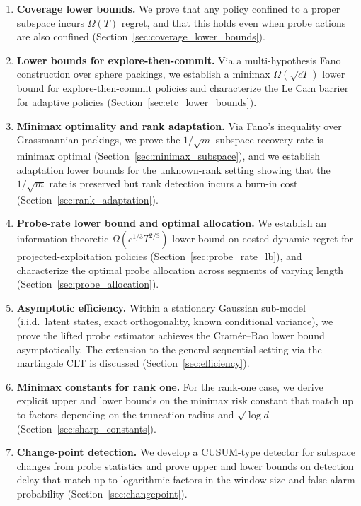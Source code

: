 \documentclass[12pt]{article}
\theoremstyle{plain}
\theoremstyle{definition}
\begin{document}
\begin{enumerate}[leftmargin=1.5em]
\item \textbf{Coverage lower bounds.} We prove that any policy confined to a proper subspace incurs $\Omega(T)$ regret, and that this holds even when probe actions are also confined (Section~\ref{sec:coverage_lower_bounds}).

\item \textbf{Lower bounds for explore-then-commit.} Via a multi-hypothesis Fano construction over sphere packings, we establish a minimax $\Omega(\sqrt{cT})$ lower bound for explore-then-commit policies and characterize the Le Cam barrier for adaptive policies (Section~\ref{sec:etc_lower_bounds}).

\item \textbf{Minimax optimality and rank adaptation.} Via Fano's inequality over Grassmannian packings, we prove the $1/\sqrt{m}$ subspace recovery rate is minimax optimal (Section~\ref{sec:minimax_subspace}), and we establish adaptation lower bounds for the unknown-rank setting showing that the $1/\sqrt{m}$ rate is preserved but rank detection incurs a burn-in cost (Section~\ref{sec:rank_adaptation}).

\item \textbf{Probe-rate lower bound and optimal allocation.} We establish an information-theoretic $\Omega(c^{1/3}T^{2/3})$ lower bound on costed dynamic regret for projected-exploitation policies (Section~\ref{sec:probe_rate_lb}), and characterize the optimal probe allocation across segments of varying length (Section~\ref{sec:probe_allocation}).

\item \textbf{Asymptotic efficiency.} Within a stationary Gaussian sub-model (i.i.d.\ latent states, exact orthogonality, known conditional variance), we prove the lifted probe estimator achieves the Cram\'er--Rao lower bound asymptotically. The extension to the general sequential setting via the martingale CLT is discussed (Section~\ref{sec:efficiency}).

\item \textbf{Minimax constants for rank one.} For the rank-one case, we derive explicit upper and lower bounds on the minimax risk constant that match up to factors depending on the truncation radius and $\sqrt{\log d}$ (Section~\ref{sec:sharp_constants}).

\item \textbf{Change-point detection.} We develop a CUSUM-type detector for subspace changes from probe statistics and prove upper and lower bounds on detection delay that match up to logarithmic factors in the window size and false-alarm probability (Section~\ref{sec:changepoint}).
\end{enumerate}
\end{document}
